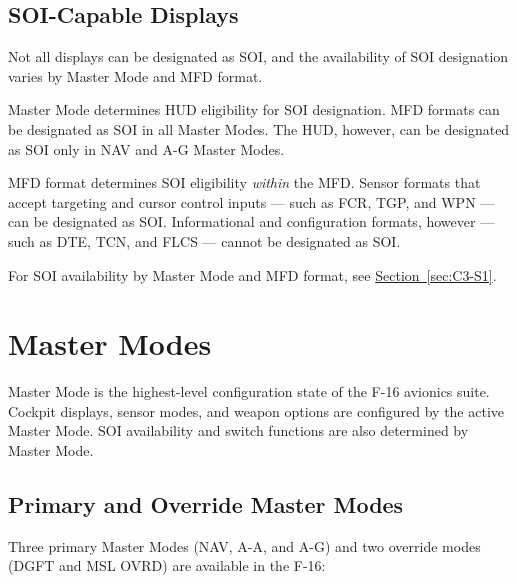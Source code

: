 \documentclass[11pt, a4paper, twoside]{report}
\newcommand{\secref}[1]{\hyperref[#1]{Section~\ref*{#1}}}
\begin{document}
\subsection{SOI-Capable Displays}
\label{sec:C2-S1-S3}

Not all displays can be designated as SOI, and the availability of SOI designation varies by Master Mode and MFD format.

Master Mode determines HUD eligibility for SOI designation. MFD formats can be designated as SOI in all Master Modes. The HUD, however, can be designated as SOI only in NAV and A-G Master Modes.

MFD format determines SOI eligibility \textit{within} the MFD. Sensor formats that accept targeting and cursor control inputs --- such as FCR, TGP, and WPN --- can be designated as SOI. Informational and configuration formats, however --- such as DTE, TCN, and FLCS --- cannot be designated as SOI.

For SOI availability by Master Mode and MFD format, see \secref{sec:C3-S1}.

\section{Master Modes}
\label{sec:C2-S2}

Master Mode is the highest-level configuration state of the F-16 avionics suite. Cockpit displays, sensor modes, and weapon options are configured by the active Master Mode. SOI availability and switch functions are also determined by Master Mode.

\subsection{Primary and Override Master Modes}
\label{sec:C2-S2-S1}

Three primary Master Modes (NAV, A-A, and A-G) and two override modes (DGFT and MSL OVRD) are available in the F-16:
\end{document}
